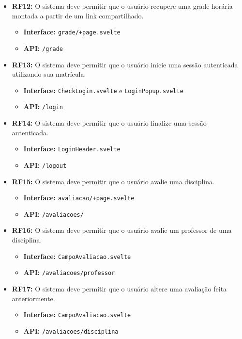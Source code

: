 \begin{itemize}
    \item \textbf{RF12:} O sistema deve permitir que o usuário recupere uma grade horária montada a partir de um link compartilhado.
    \begin{itemize}
        \item \textbf{Interface:} \verb|grade/+page.svelte|
        \item \textbf{API:} \verb|/grade|
    \end{itemize}

    \item \textbf{RF13:} O sistema deve permitir que o usuário inicie uma sessão autenticada utilizando sua matrícula.
    \begin{itemize}
        \item \textbf{Interface:} \verb|CheckLogin.svelte| e \verb|LoginPopup.svelte|
        \item \textbf{API:} \verb|/login|
    \end{itemize}

    \item \textbf{RF14:} O sistema deve permitir que o usuário finalize uma sessão autenticada.
    \begin{itemize}
        \item \textbf{Interface:} \verb|LoginHeader.svelte|
        \item \textbf{API:} \verb|/logout|
    \end{itemize}

    \item \textbf{RF15:} O sistema deve permitir que o usuário avalie uma disciplina.
    \begin{itemize}
        \item \textbf{Interface:} \verb|avaliacao/+page.svelte|
        \item \textbf{API:} \verb|/avaliacoes/|
    \end{itemize}

    \item \textbf{RF16:} O sistema deve permitir que o usuário avalie um professor de uma disciplina.
    \begin{itemize}
        \item \textbf{Interface:} \verb|CampoAvaliacao.svelte|
        \item \textbf{API:} \verb|/avaliacoes/professor| 
    \end{itemize}

    \item \textbf{RF17:} O sistema deve permitir que o usuário altere uma avaliação feita anteriormente.
    \begin{itemize}
        \item \textbf{Interface:} \verb|CampoAvaliacao.svelte|
        \item \textbf{API:} \verb|/avaliacoes/disciplina| 
    \end{itemize}
\end{itemize}